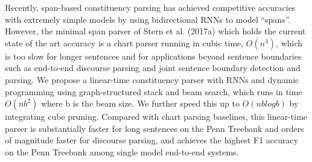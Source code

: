 Recently, span-based constituency parsing has achieved competitive accuracies with extremely simple models by using bidirectional RNNs to model ``spans''. However, the minimal span parser of Stern et al. (2017a) which holds the current state of the art accuracy is a chart parser running in cubic time, $O(n^3)$, which is too slow for longer sentences and for applications beyond sentence boundaries such as end-to-end discourse parsing and joint sentence boundary detection and parsing. We propose a linear-time constituency parser with RNNs and dynamic programming using graph-structured stack and beam search, which runs in time $O(n b^2)$ where b is the beam size. We further speed this up to $O(n b log b)$ by integrating cube pruning. Compared with chart parsing baselines, this linear-time parser is substantially faster for long sentences on the Penn Treebank and orders of magnitude faster for discourse parsing, and achieves the highest F1 accuracy on the Penn Treebank among single model end-to-end systems.
